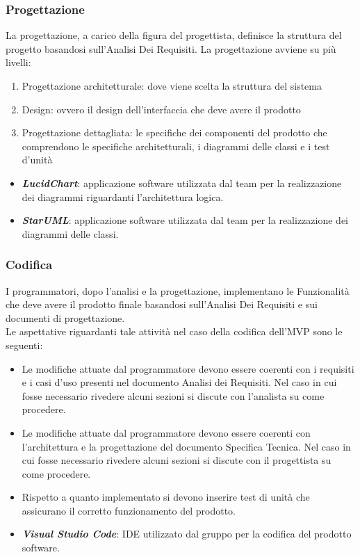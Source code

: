 \subsubsection{Progettazione}
La progettazione, a carico della figura del progettista, definisce la struttura del progetto basandosi sull'Analisi Dei Requisiti.
La progettazione avviene su più livelli:
\begin{enumerate}
    \item Progettazione architetturale: dove viene scelta la struttura del sistema
    \item Design: ovvero il design dell'interfaccia che deve avere il prodotto
    \item Progettazione dettagliata: le specifiche dei componenti del prodotto che comprendono le specifiche architetturali, i diagrammi delle classi e i test d'unità
\end{enumerate}
\begin{itemize}
    \item \emph{\textbf{LucidChart}}: applicazione software utilizzata dal team per la realizzazione dei diagrammi riguardanti l'architettura logica.
    \item \emph{\textbf{StarUML}}: applicazione software utilizzata dal team per la realizzazione dei diagrammi delle classi.
\end{itemize}
\subsubsection{Codifica}
I programmatori, dopo l'analisi e la progettazione, implementano le Funzionalità che deve avere il prodotto finale basandosi sull'Analisi Dei Requisiti e sui documenti di progettazione.\\
Le aspettative riguardanti tale attività nel caso della codifica dell'MVP sono le seguenti:
\begin{itemize}
    \item  Le modifiche attuate dal programmatore devono essere coerenti con i requisiti e i casi d'uso presenti nel documento Analisi dei Requisiti.
    Nel caso in cui fosse necessario rivedere alcuni sezioni si discute con l'analista su come procedere.
    \item Le modifiche attuate dal programmatore devono essere coerenti con l'architettura e la progettazione del documento Specifica Tecnica. Nel caso in cui fosse necessario rivedere alcuni sezioni si discute con il progettista su come procedere.
    \item Rispetto a quanto implementato si devono inserire test di unità che assicurano il corretto funzionamento del prodotto.
\end{itemize}
\begin{itemize}
    \item \emph{\textbf{Visual Studio Code}}: IDE utilizzato dal gruppo per la codifica del prodotto software.
\end{itemize}
